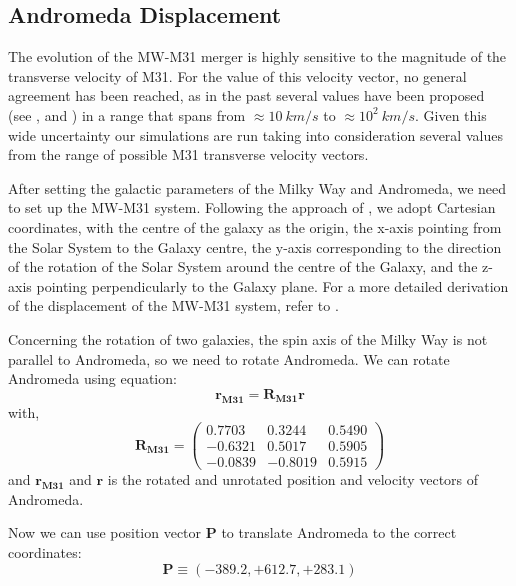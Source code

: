 \documentclass[a4paper,12pt, english]{article}
\begin{document}
\subsection{Andromeda Displacement}
\label{m31-displacement}
The evolution of the MW-M31 merger is highly sensitive to the magnitude of the transverse velocity of M31. For the value of this velocity vector, no general agreement has been reached, as in the past several values have been proposed (see \textcite{van_der_Marel_2012b}, \textcite{Salomon_2016} and \textcite{van_der_Marel_2019}) in a range that spans from \(\approx 10\: km/s\) to \(\approx 10^2\: km/s\). Given this wide uncertainty our simulations are run taking into consideration several values from the range of possible M31 transverse velocity vectors.\par
\smallskip
After setting the galactic parameters of the Milky Way and Andromeda, we need to set up the MW-M31 system. Following the approach of \textcite{van_der_Marel_2008}, we adopt Cartesian coordinates, with the centre of the galaxy as the origin, the x-axis pointing from the Solar System to the Galaxy centre, the y-axis corresponding to the direction of the rotation of the Solar System around the centre of the Galaxy, and the z-axis pointing perpendicularly to the Galaxy plane. For a more detailed derivation of the displacement of the MW-M31 system, refer to \textcite{Withagen_2019}.\par
\smallskip
Concerning the rotation of two galaxies, the spin axis of the Milky Way is not parallel to Andromeda, so we need to rotate Andromeda. We can rotate Andromeda using equation:
\begin{equation}
    \boldsymbol{r_{M31}} = \boldsymbol{R_{M31}r}
\end{equation}
with,
\begin{equation}
    \boldsymbol{R_{M31}} = \left(\begin{array}{ccc}
         0.7703 & 0.3244 & 0.5490 \\
         -0.6321 & 0.5017 & 0.5905 \\
         -0.0839 & -0.8019 & 0.5915
    \end{array}\right)
\end{equation}
and $ \boldsymbol{r_{M31}} $ and $ \boldsymbol{r} $ is the rotated and unrotated position and velocity vectors of Andromeda.\par
\smallskip
Now we can use position vector $ \boldsymbol P$ to translate Andromeda to the correct coordinates:
\begin{equation}
    \boldsymbol{P} \equiv \left(-389.2,+612.7,+283.1\right)
\end{equation}\par
\end{document}
